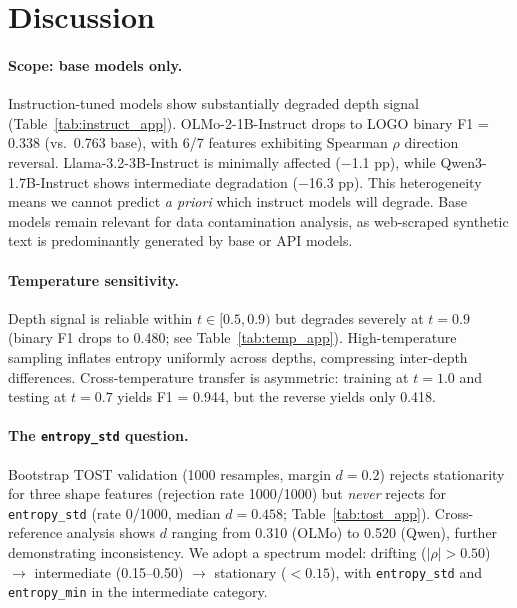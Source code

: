 \documentclass[11pt,a4paper]{article}
\begin{document}
\section{Discussion}

\paragraph{Scope: base models only.}
Instruction-tuned models show substantially degraded depth signal (Table~\ref{tab:instruct_app}).
OLMo-2-1B-Instruct drops to LOGO binary F1 = 0.338 (vs.\ 0.763 base), with 6/7 features exhibiting Spearman $\rho$ direction reversal.
Llama-3.2-3B-Instruct is minimally affected ($-$1.1 pp), while Qwen3-1.7B-Instruct shows intermediate degradation ($-$16.3 pp).
This heterogeneity means we cannot predict \textit{a priori} which instruct models will degrade.
Base models remain relevant for data contamination analysis, as web-scraped synthetic text is predominantly generated by base or API models.

\paragraph{Temperature sensitivity.}
Depth signal is reliable within $t \in [0.5, 0.9)$ but degrades severely at $t = 0.9$ (binary F1 drops to 0.480; see Table~\ref{tab:temp_app}).
High-temperature sampling inflates entropy uniformly across depths, compressing inter-depth differences.
Cross-temperature transfer is asymmetric: training at $t = 1.0$ and testing at $t = 0.7$ yields F1 = 0.944, but the reverse yields only 0.418.

\paragraph{The \texttt{entropy\_std} question.}
Bootstrap TOST validation (1000 resamples, margin $d = 0.2$) rejects stationarity for three shape features (rejection rate 1000/1000) but \emph{never} rejects for \texttt{entropy\_std} (rate 0/1000, median $d = 0.458$; Table~\ref{tab:tost_app}).
Cross-reference analysis shows $d$ ranging from 0.310 (OLMo) to 0.520 (Qwen), further demonstrating inconsistency.
We adopt a spectrum model: drifting ($|\rho| > 0.50$) $\to$ intermediate (0.15--0.50) $\to$ stationary ($< 0.15$), with \texttt{entropy\_std} and \texttt{entropy\_min} in the intermediate category.
\end{document}
